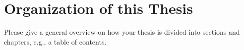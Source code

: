 \chapter{Organization of this Thesis}
Please give a general overview on how your thesis is divided into sections and chapters, e.g., a table of contents.

\begingroup
\let\clearpage\relax
\tableofcontents
\endgroup
